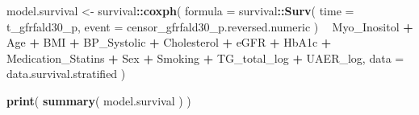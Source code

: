 \documentclass[]{article}
\newenvironment{Shaded}{\begin{snugshade}}{\end{snugshade}}
\newcommand{\DataTypeTok}[1]{\textcolor[rgb]{0.13,0.29,0.53}{#1}}
\newcommand{\KeywordTok}[1]{\textcolor[rgb]{0.13,0.29,0.53}{\textbf{#1}}}
\newcommand{\NormalTok}[1]{#1}
\newcommand{\OperatorTok}[1]{\textcolor[rgb]{0.81,0.36,0.00}{\textbf{#1}}}
\newcommand{\StringTok}[1]{\textcolor[rgb]{0.31,0.60,0.02}{#1}}
\begin{document}
\begin{Shaded}
\begin{Highlighting}[]
\NormalTok{model.survival <-}
\StringTok{  }\NormalTok{survival}\OperatorTok{::}\KeywordTok{coxph}\NormalTok{( }
    \DataTypeTok{formula =}
\NormalTok{      survival}\OperatorTok{::}\KeywordTok{Surv}\NormalTok{(}
        \DataTypeTok{time =}\NormalTok{ t_gfrfald30_p, }
        \DataTypeTok{event =}\NormalTok{ censor_gfrfald30_p.reversed.numeric}
\NormalTok{      ) }
    \OperatorTok{~}\StringTok{ }
\StringTok{      }\NormalTok{Myo_Inositol }\OperatorTok{+}
\StringTok{      }\NormalTok{Age }\OperatorTok{+}
\StringTok{      }\NormalTok{BMI }\OperatorTok{+}\StringTok{ }
\StringTok{      }\NormalTok{BP_Systolic }\OperatorTok{+}\StringTok{ }
\StringTok{      }\NormalTok{Cholesterol }\OperatorTok{+}\StringTok{ }
\StringTok{      }\NormalTok{eGFR }\OperatorTok{+}\StringTok{ }
\StringTok{      }\NormalTok{HbA1c }\OperatorTok{+}
\StringTok{      }\NormalTok{Medication_Statins }\OperatorTok{+}
\StringTok{      }\NormalTok{Sex }\OperatorTok{+}\StringTok{  }
\StringTok{      }\NormalTok{Smoking }\OperatorTok{+}\StringTok{ }
\StringTok{      }\NormalTok{TG_total_log }\OperatorTok{+}
\StringTok{      }\NormalTok{UAER_log, }
    \DataTypeTok{data =}\NormalTok{ data.survival.stratified}
\NormalTok{  )}

\KeywordTok{print}\NormalTok{( }\KeywordTok{summary}\NormalTok{( model.survival ) )}
\end{Highlighting}
\end{Shaded}
\end{document}
